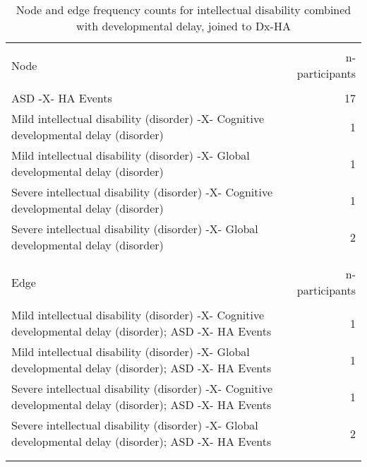 \documentclass[10pt, letterpaper]{article}
\begin{document}
\begin{spacing}{1.0}
\begin{small}
    \begin{longtable}[H]{p{5in}r}
        \caption{Node and edge frequency counts for intellectual disability combined with developmental delay, joined to Dx-HA}\\
        \hline\\[-8pt]
        Node & n-participants\\
        \hline\\[-6pt]
        ASD -X- HA Events & 17 \\
        \rowcolor{ltBlue}
        Mild intellectual disability (disorder) -X- Cognitive developmental delay (disorder) & 1 \\
        Mild intellectual disability (disorder) -X- Global developmental delay (disorder) & 1 \\
        \rowcolor{ltBlue}
        Severe intellectual disability (disorder) -X- Cognitive developmental delay (disorder) & 1 \\
        Severe intellectual disability (disorder) -X- Global developmental delay (disorder) & 2 \\
        &\\[-6pt]
        \hline\\[-8pt]
        Edge & n-participants\\
        \hline\\[-6pt]
        Mild intellectual disability (disorder) -X- Cognitive developmental delay (disorder); ASD -X- HA Events & 1 \\
        \rowcolor{ltBlue}
        Mild intellectual disability (disorder) -X- Global developmental delay (disorder); ASD -X- HA Events & 1 \\
        Severe intellectual disability (disorder) -X- Cognitive developmental delay (disorder); ASD -X- HA Events & 1 \\
        \rowcolor{ltBlue}
        Severe intellectual disability (disorder) -X- Global developmental delay (disorder); ASD -X- HA Events & 2 \\
        & \\[-6pt]
        \hline
        \label{tab:IDDD-Dx-HA-01}
    \end{longtable}
\end{small}
    
\end{spacing}
    
\end{document}
